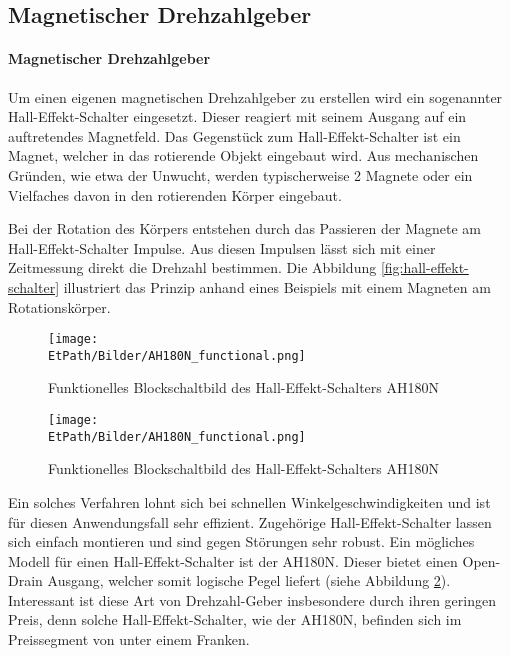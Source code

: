 \ifSTANDALONE
\subsection{Magnetischer Drehzahlgeber}
\fi
\ifEMBED
\newpage
\paragraph{Magnetischer Drehzahlgeber}$~~$\vspace{2mm}\\
\fi
Um einen eigenen magnetischen Drehzahlgeber zu erstellen wird ein
sogenannter Hall-Effekt-Schalter eingesetzt. Dieser reagiert mit seinem Ausgang
auf ein auftretendes Magnetfeld. Das Gegenstück zum Hall-Effekt-Schalter
ist ein Magnet, welcher in das rotierende Objekt eingebaut wird. Aus 
mechanischen Gründen, wie etwa der Unwucht, werden typischerweise 2 Magnete
oder ein Vielfaches davon in den rotierenden Körper eingebaut.

Bei der Rotation des Körpers entstehen durch das Passieren der Magnete
am Hall-Effekt-Schalter Impulse. Aus diesen Impulsen lässt sich mit einer
Zeitmessung direkt die Drehzahl bestimmen. Die Abbildung 
\ref{fig:hall-effekt-schalter} illustriert das Prinzip anhand eines
Beispiels mit einem Magneten am Rotationskörper.
%
\ifSTANDALONE
\begin{figure}[h!]
	\centering
	\texttt{[image: \\EtPath/Bilder/AH180N\_functional.png]}
	\caption{Funktionelles Blockschaltbild des Hall-Effekt-Schalters AH180N}
	\label{fig:AH180N_functional}
\end{figure}
\fi
%
\ifEMBED
\begin{figure}[h!]
	\centering
	\texttt{[image: \\EtPath/Bilder/AH180N\_functional.png]}
	\caption{Funktionelles Blockschaltbild des Hall-Effekt-Schalters AH180N}
	\label{fig:AH180N_functional}
\end{figure}
\fi
%
Ein solches Verfahren lohnt sich bei schnellen Winkelgeschwindigkeiten
und ist für diesen Anwendungsfall sehr effizient. Zugehörige
Hall-Effekt-Schalter lassen sich einfach montieren und sind gegen Störungen
sehr robust. Ein mögliches Modell für einen Hall-Effekt-Schalter ist der
AH180N. Dieser bietet einen Open-Drain Ausgang, welcher somit logische Pegel
liefert (siehe Abbildung \ref{fig:AH180N_functional}). Interessant ist diese
Art von Drehzahl-Geber insbesondere durch ihren geringen Preis, denn solche
Hall-Effekt-Schalter, wie der AH180N, befinden sich im Preissegment von 
unter einem Franken.